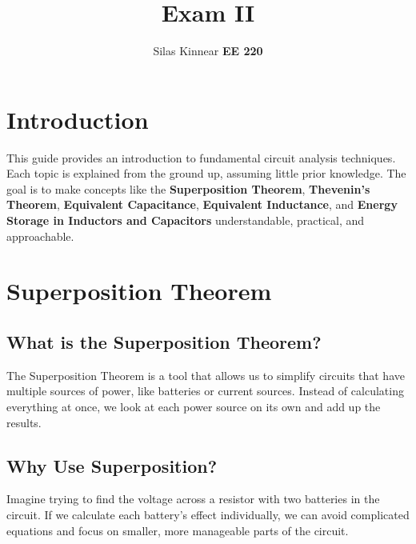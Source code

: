 \documentclass{article}
\title{Exam II}
\author{Silas Kinnear \textbf{EE 220}}
\date{}
\begin{document}
\maketitle

\tableofcontents
\newpage

\section{Introduction}
This guide provides an introduction to fundamental circuit analysis techniques. Each topic is explained from the ground up, assuming little prior knowledge. The goal is to make concepts like the \textbf{Superposition Theorem}, \textbf{Thevenin's Theorem}, \textbf{Equivalent Capacitance}, \textbf{Equivalent Inductance}, and \textbf{Energy Storage in Inductors and Capacitors} understandable, practical, and approachable.

\section{Superposition Theorem}

\subsection{What is the Superposition Theorem?}
The Superposition Theorem is a tool that allows us to simplify circuits that have multiple sources of power, like batteries or current sources. Instead of calculating everything at once, we look at each power source on its own and add up the results.

\subsection{Why Use Superposition?}
Imagine trying to find the voltage across a resistor with two batteries in the circuit. If we calculate each battery’s effect individually, we can avoid complicated equations and focus on smaller, more manageable parts of the circuit.
\end{document}
